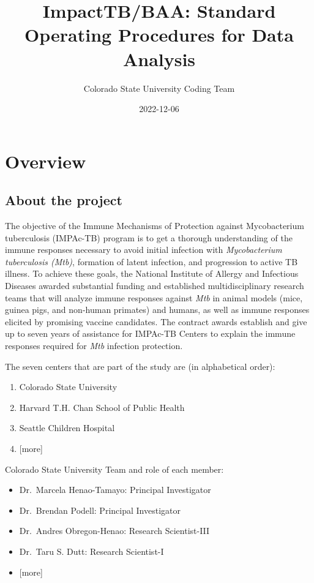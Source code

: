 \documentclass[
]{book}
\title{ImpactTB/BAA: Standard Operating Procedures for Data Analysis}
\author{Colorado State University Coding Team}
\date{2022-12-06}
\providecommand{\tightlist}{%
  \setlength{\itemsep}{0pt}\setlength{\parskip}{0pt}}
\begin{document}
\maketitle

{
\setcounter{tocdepth}{1}
\tableofcontents
}
\hypertarget{overview}{%
\chapter{Overview}\label{overview}}

\hypertarget{about-the-project}{%
\section{About the project}\label{about-the-project}}

The objective of the Immune Mechanisms of Protection against Mycobacterium tuberculosis (IMPAc-TB) program is to get a thorough understanding of the immune responses necessary to avoid initial infection with \emph{Mycobacterium tuberculosis (Mtb)}, formation of latent infection, and progression to active TB illness. To achieve these goals, the National Institute of Allergy and Infectious Diseases awarded substantial funding and established multidisciplinary research teams that will analyze immune responses against \emph{Mtb} in animal models (mice, guinea pigs, and non-human primates) and humans, as well as immune responses elicited by promising vaccine candidates. The contract awards establish and give up to seven years of assistance for IMPAc-TB Centers to explain the immune responses required for \emph{Mtb} infection protection.

The seven centers that are part of the study are (in alphabetical order):

\begin{enumerate}
\def\labelenumi{\arabic{enumi}.}
\tightlist
\item
  Colorado State University
\item
  Harvard T.H. Chan School of Public Health
\item
  Seattle Children Hospital
\item
  {[}more{]}
\end{enumerate}

Colorado State University Team and role of each member:

\begin{itemize}
\tightlist
\item
  Dr.~Marcela Henao-Tamayo: Principal Investigator
\item
  Dr.~Brendan Podell: Principal Investigator
\item
  Dr.~Andres Obregon-Henao: Research Scientist-III
\item
  Dr.~Taru S. Dutt: Research Scientist-I
\item
  {[}more{]}
\end{itemize}
\end{document}
